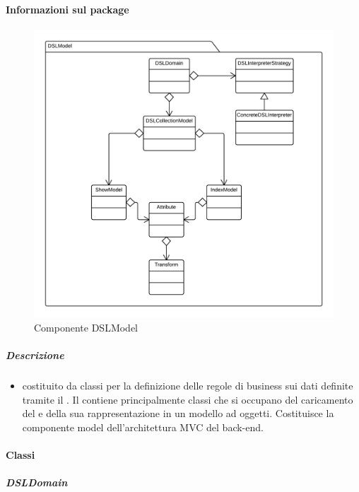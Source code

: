   \paragraph{Informazioni sul package} 
    \begin{figure}[H] 
      \begin{center} 
        \includegraphics[width=\textwidth]{uml/package/Back-end::Lib::Model::DSLModel.png}  
        \caption{Componente DSLModel}
      \end{center}  
    \end{figure} 
  \subparagraph{Descrizione} 
    \begin{itemize}
    \item[]  costituito da classi per la definizione delle regole di business sui dati definite tramite il  . Il  contiene principalmente classi che si occupano del caricamento del  e della sua rappresentazione in un modello ad oggetti. Costituisce la componente model dell’architettura MVC del back-end.

    \end{itemize} 
    \paragraph{Classi}
      \subparagraph{DSLDomain}
        
